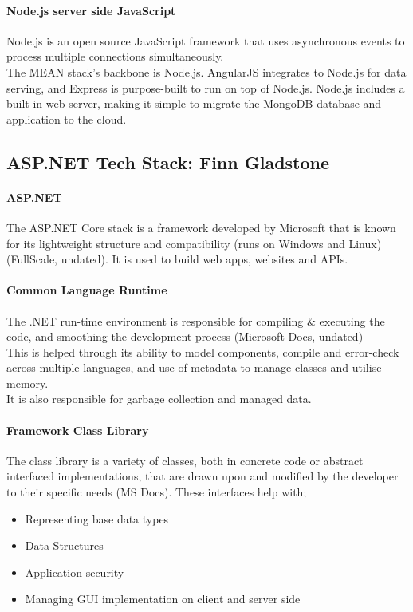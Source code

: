 \documentclass[a4paper, 11pt]{report}
\begin{document}
	\paragraph{Node.js server side JavaScript} Node.js is an open source JavaScript framework that uses asynchronous events to process multiple connections simultaneously.
	\\ The MEAN stack's backbone is Node.js. AngularJS integrates to Node.js for data serving, and Express is purpose-built to run on top of Node.js. Node.js includes a built-in web server, making it simple to migrate the MongoDB database and application to the cloud.


	\subsection{ASP.NET Tech Stack: Finn Gladstone}
	\paragraph{ASP.NET} The ASP.NET Core stack is a framework developed by Microsoft that is known for its lightweight structure and compatibility (runs on Windows and Linux) (FullScale, undated). It is used to build web apps, websites and APIs.

	\paragraph{Common Language Runtime} The .NET run-time environment is responsible for compiling \& executing the code, and smoothing the development process (Microsoft Docs, undated)
	\\This is helped through its ability to model components, compile and error-check across multiple languages, and use of metadata to manage classes and utilise memory.
	\\It is also responsible for garbage collection and managed data.

	\paragraph{Framework Class Library} The class library is a variety of classes, both in concrete code or abstract interfaced implementations, that are drawn upon and modified by the developer to their specific needs (MS Docs). These interfaces help with;
	\begin{itemize}
		\item Representing base data types
		\item Data Structures
		\item Application security
		\item Managing GUI implementation on client and server side
	\end{itemize}
\end{document}
